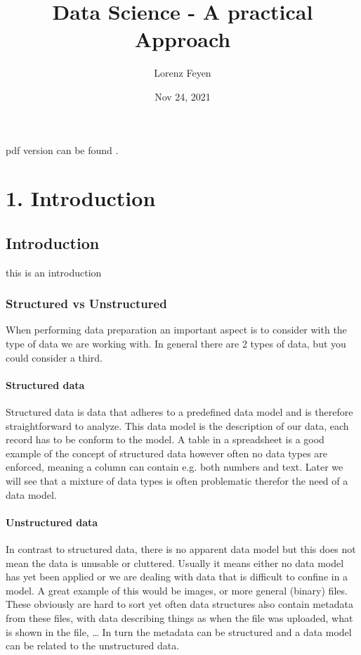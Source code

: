 \documentclass[letterpaper,10pt,english]{jupyterBook}
\title{Data Science - A practical Approach}
\date{Nov 24, 2021}
\author{Lorenz Feyen}
\begin{document}
\pagestyle{empty}
\sphinxmaketitle
\pagestyle{plain}
\sphinxtableofcontents
\pagestyle{normal}
\label{\detokenize{foreword::doc}}


\sphinxAtStartPar
pdf version can be found .


\part{1. Introduction}


\chapter{Introduction}
\label{\detokenize{c1_introduction/introduction:introduction}}\label{\detokenize{c1_introduction/introduction::doc}}
\sphinxAtStartPar
this is an introduction


\section{Structured vs Unstructured}
\label{\detokenize{c1_introduction/introduction:structured-vs-unstructured}}
\sphinxAtStartPar
When performing data preparation an important aspect is to consider with the type of data we are working with.
In general there are 2 types of data, but you could consider a third.


\subsection{Structured data}
\label{\detokenize{c1_introduction/introduction:structured-data}}
\sphinxAtStartPar
Structured data is data that adheres to a pre\sphinxhyphen{}defined data model and is therefore straightforward to analyze.
This data model is the description of our data, each record has to be conform to the model.
A table in a spreadsheet is a good example of the concept of structured data however often no data types are enforced, meaning a column can contain e.g. both numbers and text.
Later we will see that a mixture of data types is often problematic therefor the need of a data model.


\subsection{Unstructured data}
\label{\detokenize{c1_introduction/introduction:unstructured-data}}
\sphinxAtStartPar
In contrast to structured data, there is no apparent data model but this does not mean the data is unusable or cluttered.
Usually it means either no data model has yet been applied or we are dealing with data that is difficult to confine in a model.
A great example of this would be images, or more general (binary) files.
These obviously are hard to sort yet often data structures also contain metadata from these files, with data describing things as when the file was uploaded, what is shown in the file, …
In turn the metadata can be structured and a data model can be related to the unstructured data.
\end{document}
